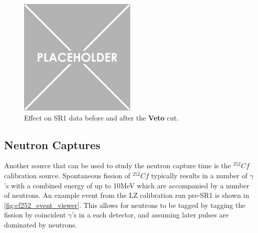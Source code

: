 




\begin{figure}[!htbp]
    \centering
    \includegraphics[width=0.5\textwidth]{Figures/Placeholder.png}
    \caption{Effect on SR1 data before and after the \textbf{Veto} cut.}
    \label{fig:tpc_with_od_veto_in_sr1}
\end{figure}



\subsection{Neutron Captures}
\par
Another source that can be used to study the neutron capture time is the ${}^{252}{Cf}$ calibration source.
Spontaneous fission of ${}^{252}{Cf}$ typically results in a number of $\gamma$'s with a combined energy of up to 10MeV which are accompanied by a number of neutrons.
An example event from the LZ calibration run pre-SR1 is shown in \autoref{fig:cf252_event_viewer}.
This allows for neutrons to be tagged by tagging the fission by coincident $\gamma$'s in a each detector, and assuming later pulses are dominated by neutrons.

